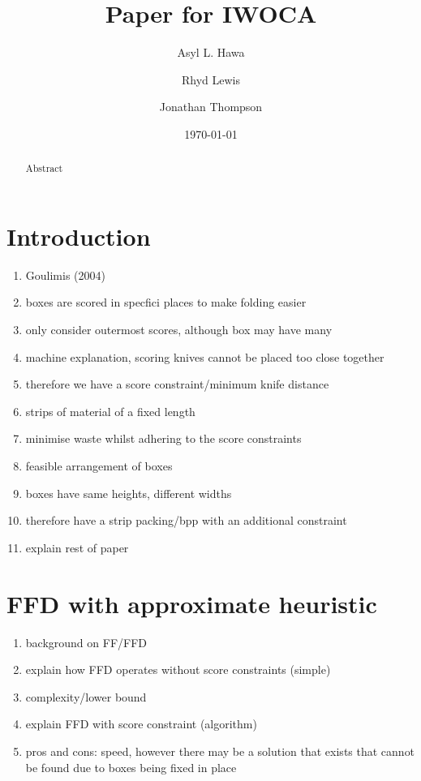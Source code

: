 \documentclass{llncs}
\title{Paper for IWOCA}
\author{Asyl L. Hawa \and Rhyd Lewis \and Jonathan Thompson}
\institute{School of Mathematics, Cardiff University, Senghennydd Road, Cardiff, UK, CF24 4AG}
\date{\today}
\begin{document}
\maketitle

\begin{abstract}
	Abstract
\end{abstract}

\section{Introduction}
\begin{enumerate}
	\item Goulimis (2004)
	\item boxes are scored in specfici places to make folding easier 
	\item only consider outermost scores, although box may have many 
	\item machine explanation, scoring knives cannot be placed too close together
	\item therefore we have a score constraint/minimum knife distance
	\item strips of material of a fixed length
	\item minimise waste whilst adhering to the score constraints
	\item feasible arrangement of boxes
	\item boxes have same heights, different widths
	\item therefore have a strip packing/bpp with an additional constraint
	\item explain rest of paper
\end{enumerate}


\section{FFD with approximate heuristic}
\begin{enumerate}
	\item background on FF/FFD
	\item explain how FFD operates without score constraints (simple)
	\item complexity/lower bound
	\item explain FFD with score constraint (algorithm)
	\item pros and cons: speed, however there may be a solution that exists that cannot be found due to boxes being fixed in place
\end{enumerate}
\end{document}
